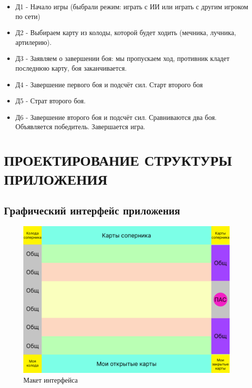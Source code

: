 \documentclass[12pt, a4paper, simple]{eskdtext}
\begin{document}
    \begin{itemize}
        \item Д1 - Начало игры (быбрали режим: играть с ИИ или играть с другим игроком по сети)
        \item Д2 - Выбираем карту из колоды, которой будет ходить (мечника, лучника, артилерию).
        \item Д3 - Заявляем о завершении боя: мы пропускаем ход, противник кладет последнюю карту, боя заканчивается.
        \item Д4 - Завершение первого боя и подсчёт сил. Старт второго боя
        \item Д5 - Страт второго боя.
        \item Д6 - Завершение второго боя и подсчёт сил. Сравниваются два боя. Объявляется победитель. Завершается игра.
    \end{itemize}

    \newpage
    \section{ПРОЕКТИРОВАНИЕ СТРУКТУРЫ ПРИЛОЖЕНИЯ}

    
    \subsection{Графический интерфейс приложения}
    
    \begin{figure}[!h]
        \centering
        \includegraphics[width=16cm]
            {../sources/game_ux/build/game_ux.png}
        \caption{Макет интерфейса}
    \end{figure}
\end{document}
